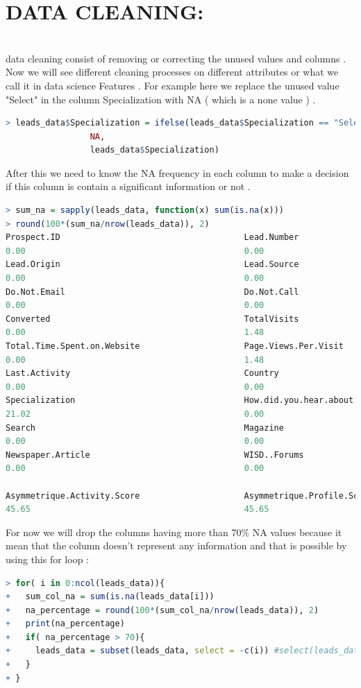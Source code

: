 \section{DATA CLEANING:}\\
data cleaning consist of removing or correcting the unused values and columns . Now we will see different cleaning processes on different attributes or what we call it in data science Features . 
For example here we replace the unused value "Select" in the column Specialization with NA ( which is a none value ) .
\begin{lstlisting}[language=R]
> leads_data$Specialization = ifelse(leads_data$Specialization == "Select",
                 NA,
                 leads_data$Specialization)
\end{lstlisting}
After this we need to know the NA frequency in each column to make a decision if this column is contain a significant information or not . 
\begin{lstlisting}[language=R]
> sum_na = sapply(leads_data, function(x) sum(is.na(x)))
> round(100*(sum_na/nrow(leads_data)), 2)
Prospect.ID                                     Lead.Number 
0.00                                            0.00 
Lead.Origin                                     Lead.Source 
0.00                                            0.00 
Do.Not.Email                                    Do.Not.Call 
0.00                                            0.00 
Converted                                       TotalVisits 
0.00                                            1.48 
Total.Time.Spent.on.Website                     Page.Views.Per.Visit 
0.00                                            1.48 
Last.Activity                                   Country 
0.00                                            0.00 
Specialization                                  How.did.you.hear.about.WISD 
21.02                                           0.00 
Search                                          Magazine 
0.00                                            0.00 
Newspaper.Article                               WISD..Forums 
0.00                                            0.00 

Asymmetrique.Activity.Score                     Asymmetrique.Profile.Score 
45.65                                           45.65 
\end{lstlisting}
For now we will drop the columns having more than 70\% NA values because it mean that the column doesn't represent any information and that is possible by using this for loop :
\begin{lstlisting}[language=R]
> for( i in 0:ncol(leads_data)){
+   sum_col_na = sum(is.na(leads_data[i]))
+   na_percentage = round(100*(sum_col_na/nrow(leads_data)), 2)
+   print(na_percentage)
+   if( na_percentage > 70){
+     leads_data = subset(leads_data, select = -c(i)) #select(leads_data, i)
+   }
+ }
\end{lstlisting}
